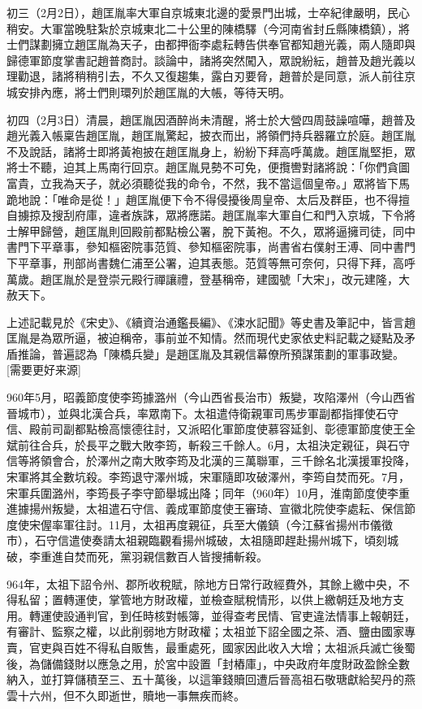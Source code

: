 初三（2月2日），趙匡胤率大軍自京城東北邊的愛景門出城，士卒紀律嚴明，民心稍安。大軍當晚駐紮於京城東北二十公里的陳橋驛（今河南省封丘縣陳橋鎮），將士們謀劃擁立趙匡胤為天子，由都押衙李處耘轉告供奉官都知趙光義，兩人隨即與歸德軍節度掌書記趙普商討。談論中，諸將突然闖入，眾說紛紜，趙普及趙光義以理勸退，諸將稍稍引去，不久又復趨集，露白刃要脅，趙普於是同意，派人前往京城安排內應，將士們則環列於趙匡胤的大帳，等待天明。

初四（2月3日）清晨，趙匡胤因酒醉尚未清醒，將士於大營四周鼓譟喧嘩，趙普及趙光義入帳稟告趙匡胤，趙匡胤驚起，披衣而出，將領們持兵器羅立於庭。趙匡胤不及說話，諸將士即將黃袍披在趙匡胤身上，紛紛下拜高呼萬歲。趙匡胤堅拒，眾將士不聽，迫其上馬南行回京。趙匡胤見勢不可免，便攬轡對諸將說：「你們貪圖富貴，立我為天子，就必須聽從我的命令，不然，我不當這個皇帝。」眾將皆下馬跪地說：「唯命是從！」趙匡胤便下令不得侵擾後周皇帝、太后及群臣，也不得擅自擄掠及搜刮府庫，違者族誅，眾將應諾。趙匡胤率大軍自仁和門入京城，下令將士解甲歸營，趙匡胤則回殿前都點檢公署，脫下黃袍。不久，眾將逼擁司徒，同中書門下平章事，參知樞密院事范質、參知樞密院事，尚書省右僕射王溥、同中書門下平章事，刑部尚書魏仁浦至公署，迫其表態。范質等無可奈何，只得下拜，高呼萬歲。趙匡胤於是登崇元殿行禪讓禮，登基稱帝，建國號「大宋」，改元建隆，大赦天下。

上述記載見於《宋史》、《續資治通鑑長編》、《涑水記聞》等史書及筆記中，皆言趙匡胤是為眾所逼，被迫稱帝，事前並不知情。然而現代史家依史料記載之疑點及矛盾推論，普遍認為「陳橋兵變」是趙匡胤及其親信幕僚所預謀策劃的軍事政變。[需要更好来源]

960年5月，昭義節度使李筠據潞州（今山西省長治市）叛變，攻陷澤州（今山西省晉城市），並與北漢合兵，率眾南下。太祖遣侍衛親軍司馬步軍副都指揮使石守信、殿前司副都點檢高懷德往討，又派昭化軍節度使慕容延釗、彰德軍節度使王全斌前往合兵，於長平之戰大敗李筠，斬殺三千餘人。6月，太祖決定親征，與石守信等將領會合，於澤州之南大敗李筠及北漢的三萬聯軍，三千餘名北漢援軍投降，宋軍將其全數坑殺。李筠退守澤州城，宋軍隨即攻破澤州，李筠自焚而死。7月，宋軍兵圍潞州，李筠長子李守節舉城出降；同年（960年）10月，淮南節度使李重進據揚州叛變，太祖遣石守信、義成軍節度使王審琦、宣徽北院使李處耘、保信節度使宋偓率軍往討。11月，太祖再度親征，兵至大儀鎮（今江蘇省揚州市儀徵市），石守信遣使奏請太祖親臨觀看揚州城破，太祖隨即趕赴揚州城下，頃刻城破，李重進自焚而死，黨羽親信數百人皆搜捕斬殺。

964年，太祖下詔令州、郡所收稅賦，除地方日常行政經費外，其餘上繳中央，不得私留；置轉運使，掌管地方財政權，並檢查賦稅情形，以供上繳朝廷及地方支用。轉運使設通判官，到任時核對帳簿，並得查考民情、官吏違法情事上報朝廷，有審計、監察之權，以此削弱地方財政權；太祖並下詔全國之茶、酒、鹽由國家專賣，官吏與百姓不得私自販售，最重處死，國家因此收入大增；太祖派兵滅亡後蜀後，為儲備錢財以應急之用，於宮中設置「封樁庫」，中央政府年度財政盈餘全數納入，並打算儲積至三、五十萬後，以這筆錢贖回遭后晉高祖石敬瑭獻給契丹的燕雲十六州，但不久即逝世，贖地一事無疾而終。

